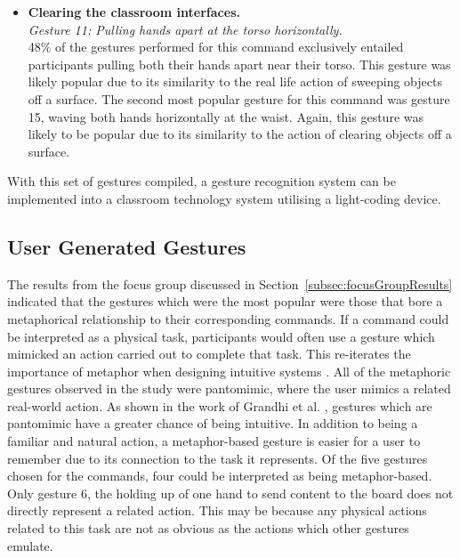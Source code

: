 \documentclass[link]{IWCOMP}
\begin{document}
\begin{itemize}
\item \textbf{Clearing the classroom interfaces.}\\
\textit{Gesture 11: Pulling hands apart at the torso horizontally.}\\
48\% of the gestures performed for this command exclusively entailed participants pulling both their hands apart near their torso.
This gesture was likely popular due to its similarity to the real life action of sweeping objects off a surface.
The second most popular gesture for this command was gesture 15, waving both hands horizontally at the waist.
Again, this gesture was likely to be popular due to its similarity to the action of clearing objects off a surface.\\

\end{itemize}

With this set of gestures compiled, a gesture recognition system can be implemented into a classroom technology system utilising a light-coding device.

\subsection{User Generated Gestures}
\label{subsec:userGeneratedGestures}

The results from the focus group discussed in Section~\ref{subsec:focusGroupResults} indicated that the gestures which were the most popular were those that bore a metaphorical relationship to their corresponding commands.
If a command could be interpreted as a physical task, participants would often use a gesture which mimicked an action carried out to complete that task.
This re-iterates the importance of metaphor when designing intuitive systems \cite{Wang2008}.
All of the metaphoric gestures observed in the study were pantomimic, where the user mimics a related real-world action.
As shown in the work of Grandhi et al. \citeyearpar{Grandhi2011}, gestures which are pantomimic have a greater chance of being intuitive.
In addition to being a familiar and natural action, a metaphor-based gesture is easier for a user to remember due to its connection to the task it represents.
Of the five gestures chosen for the commands, four could be interpreted as being metaphor-based.
Only gesture 6, the holding up of one hand to send content to the board does not directly represent a related action.
This may be because any physical actions related to this task are not as obvious as the actions which other gestures emulate.
\end{document}
